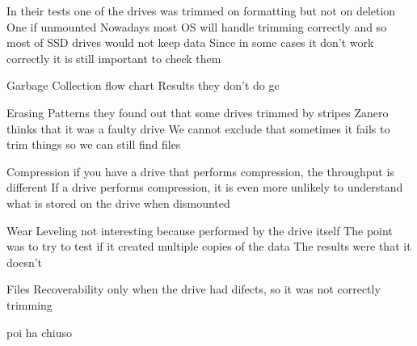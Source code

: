     In their tests one of the drives was trimmed on formatting but not on deletion 
    One if unmounted 
    Nowadays most OS will handle trimming correctly and so most of SSD drives would not keep data 
    Since in some cases it don't work correctly it is still important to check them 

Garbage Collection 
    flow chart 
Results 
    they don't do gc 

Erasing Patterns 
    they found out that some drives trimmed by stripes 
    Zanero thinks that it was a faulty drive 
    We cannot exclude that sometimes it fails to trim things so we can still find files 

Compression 
    if you have a drive that performs compression, the throughput is different 
    If a drive performs compression, it is even more unlikely to understand what is stored on the drive when dismounted 

Wear Leveling 
    not interesting because performed by the drive itself 
    The point was to try to test if it created multiple copies of the data 
    The results were that it doesn't

Files Recoverability 
    only when the drive had difects, so it was not correctly trimming 


poi ha chiuso 


